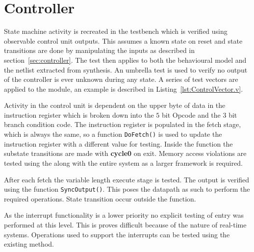
\section{Controller}

State machine activity is recreated in the testbench which is verified using observable control unit outputs.
This assumes a known state on reset and state transitions are done by manipulating the inputs as described in section~\ref{sec:controller}.  
The test then applies to both the behavioural model and the netlist extracted from synthesis.
An umbrella test is used to verify no output of the controller is ever unknown during any state.
A series of test vectors are applied to the module, an example is described in Listing~\ref{lst:ControlVector.v}.




Activity in the control unit is dependent on the upper byte of data in the instruction register which is broken down into the $5$ bit Opcode and the $3$ bit branch condition code.  
The instruction register is populated in the fetch stage, which is always the same, so a function \texttt{DoFetch()} is used to update the instruction register with a different value for testing.
Inside the function the substate transitions are made with \textbf{cycle0} on exit.
Memory access violations are tested using the along with the entire system as a larger framework is required.

After each fetch the variable length execute stage is tested.
The output is verified using the function \texttt{SyncOutput()}. 
This poses the datapath as such to perform the required operations.
State transition occur outside the function.

As the interrupt functionality is a lower priority no explicit testing of entry was performed at this level.
This is proves difficult because of the nature of real-time systems.
Operations used to support the interrupts can be tested using the existing method. 
